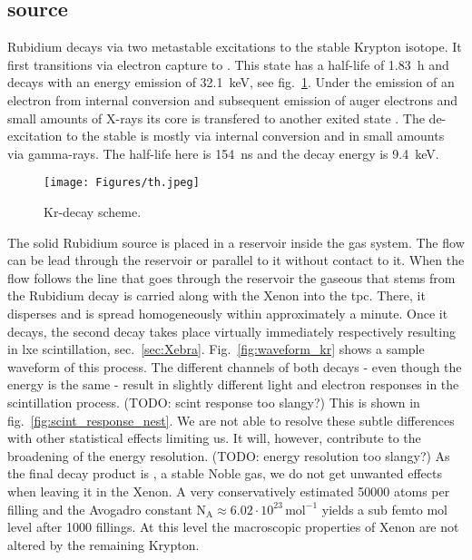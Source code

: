
\FloatBarrier
\subsection{source}
\label{ssec:source}
\FloatBarrier


Rubidium  decays via two metastable excitations to the stable  Krypton isotope.
It first transitions via electron capture to .
This state has a half-life of \SI{1.83}{\hour} and decays with an energy emission of \SI{32.1}{\kilo\electronvolt}, see fig.~\ref{fig:scheme_kr}.
Under the emission of an electron from internal conversion and subsequent emission of auger electrons and small amounts of X-rays its core is transfered to another exited state .
The de-excitation to the stable  is mostly via internal conversion and in small amounts via gamma-rays.
The half-life here is \SI{154}{\nano\s} and the decay energy is \SI{9.4}{\kilo\electronvolt}.


\begin{figure}
    \centering
    \texttt{[image: Figures/th.jpeg]}  %
    \caption[Decay Scheme Krypton]{Kr-decay scheme\cite{kr_scheme}.}
    \label{fig:scheme_kr}
\end{figure}

The solid Rubidium source is placed in a reservoir inside the gas system.
The flow can be lead through the reservoir or parallel to it without contact to it.
When the flow follows the line that goes through the reservoir the gaseous  that stems from the Rubidium decay is carried along with the Xenon into the \gls{tpc}.
There, it disperses and is spread homogeneously within approximately a minute.
Once it decays, the second decay takes place virtually immediately respectively resulting in \gls{lxe} scintillation, sec.~\ref{sec:Xebra}.
Fig.~\ref{fig:waveform_kr} shows a sample waveform of this process.
The different channels of both decays - even though the energy is the same - result in slightly different light and electron responses in the scintillation process. (TODO: scint response too slangy?)
This is shown in fig.~\ref{fig:scint_response_nest}.
We are not able to resolve these subtle differences with other statistical effects limiting us.
It will, however, contribute to the broadening of the energy resolution. (TODO: energy resolution too slangy?)
As the final decay product is , a stable Noble gas, we do not get unwanted effects when leaving it in the Xenon.
A very conservatively estimated \SI{50000}{} atoms per filling and the Avogadro constant $ \mathrm{N}_\mathrm{A} \approx 6.02\cdot10^{23}\,\mathrm{mol}^{-1} $ yields a sub femto mol level after 1000 fillings.
At this level the macroscopic properties of Xenon are not altered by the remaining Krypton.



